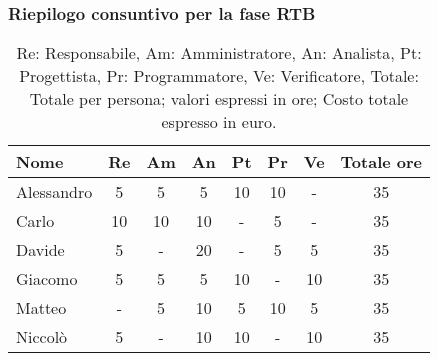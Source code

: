 \subsubsection{Riepilogo consuntivo per la fase RTB}
\begin{table}[H]
	\centering
	\begin{tabular}{l|c|c|c|c|c|c|c}
		\textbf{Nome} & \textbf{Re} & \textbf{Am} & \textbf{An} & \textbf{Pt} & \textbf{Pr} & \textbf{Ve} & \textbf{Totale ore} \\
		\hline
		Alessandro    & 5           & 5           & 5           & 10          & 10          & -           & 35                  \\
		Carlo         & 10          & 10          & 10          & -           & 5           & -           & 35                  \\
		Davide        & 5           & -           & 20          & -           & 5           & 5           & 35                  \\
		Giacomo       & 5           & 5           & 5           & 10          & -           & 10          & 35                  \\
		Matteo        & -           & 5           & 10          & 5           & 10          & 5           & 35                  \\
		Niccolò       & 5           & -           & 10          & 10          & -           & 10          & 35                  \\
		\hline
	\end{tabular}
	\caption{Re: Responsabile, Am: Amministratore, An: Analista, Pt: Progettista,
		Pr: Programmatore, Ve: Verificatore, Totale: Totale per persona; valori espressi in ore; Costo totale espresso in euro.}
\end{table}


